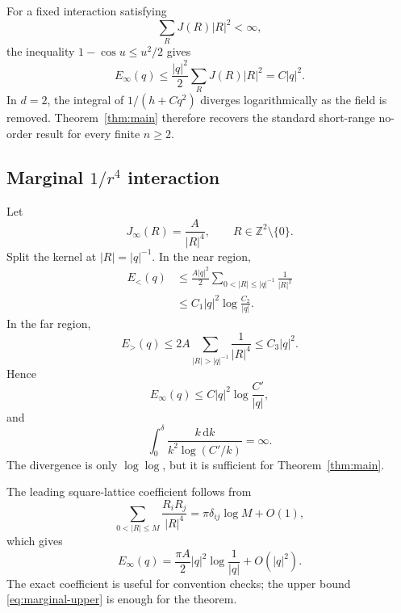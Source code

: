 \documentclass[aps,prb,twocolumn,groupedaddress,amsmath,amssymb,
               superscriptaddress,nofootinbib,floatfix]{revtex4-2}
\theoremstyle{plain}
\theoremstyle{definition}
\newcommand{\dd}{\mathrm{d}}
\begin{document}
For a fixed interaction satisfying
\begin{equation}
 \sum_RJ(R)|R|^2<\infty,                               \label{eq:second-moment}
\end{equation}
the inequality $1-\cos u\le u^2/2$ gives
\begin{equation}
 E_\infty(q)
 \le\frac{|q|^2}{2}\sum_RJ(R)|R|^2
 =C|q|^2.                                              \label{eq:q2-bound}
\end{equation}
In $d=2$, the integral of $1/(h+Cq^2)$ diverges logarithmically as the field
is removed.  Theorem~\ref{thm:main} therefore recovers the standard
short-range no-order result for every finite $n\ge2$.

\subsection{Marginal \texorpdfstring{$1/r^4$}{1/r4} interaction}

Let
\begin{equation}
 J_\infty(R)=\frac{A}{|R|^4},
 \qquad R\in\mathbb Z^2\setminus\{0\}.                 \label{eq:r4}
\end{equation}
Split the kernel at $|R|=|q|^{-1}$.  In the near region,
\begin{align}
 E_{<}(q)
 &\le
 \frac{A|q|^2}{2}
 \sum_{0<|R|\le|q|^{-1}}\frac1{|R|^2} \nonumber\\
 &\le C_1|q|^2\log\frac{C_2}{|q|}.                    \label{eq:near-bound}
\end{align}
In the far region,
\begin{equation}
 E_{>}(q)
 \le2A\sum_{|R|>|q|^{-1}}\frac1{|R|^4}
 \le C_3|q|^2.                                         \label{eq:far-bound}
\end{equation}
Hence
\begin{equation}
 E_\infty(q)
 \le C|q|^2\log\frac{C'}{|q|},                         \label{eq:marginal-upper}
\end{equation}
and
\begin{equation}
 \int_0^\delta
 \frac{k\,\dd k}{k^2\log(C'/k)}
 =\infty.                                              \label{eq:loglog-divergence}
\end{equation}
The divergence is only $\log\log$, but it is sufficient for
Theorem~\ref{thm:main}.

The leading square-lattice coefficient follows from
\begin{equation}
 \sum_{0<|R|\le M}
 \frac{R_iR_j}{|R|^4}
 =
 \pi\delta_{ij}\log M+O(1),                            \label{eq:tensor-sum}
\end{equation}
which gives
\begin{equation}
 E_\infty(q)
 =
 \frac{\pi A}{2}|q|^2\log\frac1{|q|}
 +O(|q|^2).                                            \label{eq:exact-kernel}
\end{equation}
The exact coefficient is useful for convention checks; the upper bound
\eqref{eq:marginal-upper} is enough for the theorem.
\end{document}
